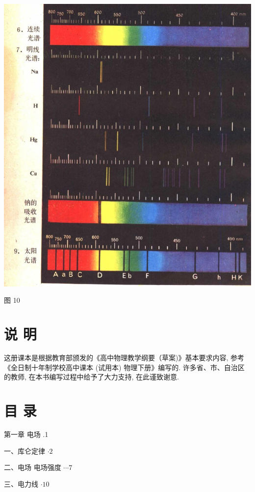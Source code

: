 \documentclass[10pt]{article}
\begin{document}
\begin{center}
\includegraphics[max width=1.0\textwidth]{images/01913056-1f15-74d8-9184-9aab52c9d66b_6_164842.jpg}
\end{center}

图 10

\section*{说 明}

这册课本是根据教育部颁发的《高中物理教学纲要（草案)》基本要求内容, 参考《全日制十年制学校高中课本 (试用本) 物理下册》编写的. 许多省、市、自治区的教师, 在本书编写过程中给予了大力支持, 在此谨致谢意.

\section*{目 录}

第一章 电场 .1

一、库仑定律 \(\cdot 2\)

二、电场 电场强度 \(\cdots 7\)

三、电力线 \(\cdot {10}\)
\end{document}
